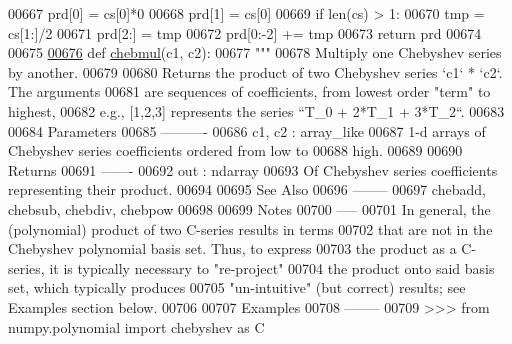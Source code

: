 \begin{DoxyCode}
00667     prd[0] = cs[0]*0
00668     prd[1] = cs[0]
00669     \textcolor{keywordflow}{if} len(cs) > 1:
00670         tmp = cs[1:]/2
00671         prd[2:] = tmp
00672         prd[0:-2] += tmp
00673     \textcolor{keywordflow}{return} prd
00674 
00675 
\hypertarget{chebyshev_8py_source_l00676}{}\hyperlink{namespacepyneb_1_1utils_1_1chebyshev_aca5aab8be2c47559d4489fd1dac11f75}{00676} \textcolor{keyword}{def }\hyperlink{namespacepyneb_1_1utils_1_1chebyshev_aca5aab8be2c47559d4489fd1dac11f75}{chebmul}(c1, c2):
00677     \textcolor{stringliteral}{"""}
00678 \textcolor{stringliteral}{    Multiply one Chebyshev series by another.}
00679 \textcolor{stringliteral}{}
00680 \textcolor{stringliteral}{    Returns the product of two Chebyshev series `c1` * `c2`.  The arguments}
00681 \textcolor{stringliteral}{    are sequences of coefficients, from lowest order "term" to highest,}
00682 \textcolor{stringliteral}{    e.g., [1,2,3] represents the series ``T\_0 + 2*T\_1 + 3*T\_2``.}
00683 \textcolor{stringliteral}{}
00684 \textcolor{stringliteral}{    Parameters}
00685 \textcolor{stringliteral}{    ----------}
00686 \textcolor{stringliteral}{    c1, c2 : array\_like}
00687 \textcolor{stringliteral}{        1-d arrays of Chebyshev series coefficients ordered from low to}
00688 \textcolor{stringliteral}{        high.}
00689 \textcolor{stringliteral}{}
00690 \textcolor{stringliteral}{    Returns}
00691 \textcolor{stringliteral}{    -------}
00692 \textcolor{stringliteral}{    out : ndarray}
00693 \textcolor{stringliteral}{        Of Chebyshev series coefficients representing their product.}
00694 \textcolor{stringliteral}{}
00695 \textcolor{stringliteral}{    See Also}
00696 \textcolor{stringliteral}{    --------}
00697 \textcolor{stringliteral}{    chebadd, chebsub, chebdiv, chebpow}
00698 \textcolor{stringliteral}{}
00699 \textcolor{stringliteral}{    Notes}
00700 \textcolor{stringliteral}{    -----}
00701 \textcolor{stringliteral}{    In general, the (polynomial) product of two C-series results in terms}
00702 \textcolor{stringliteral}{    that are not in the Chebyshev polynomial basis set.  Thus, to express}
00703 \textcolor{stringliteral}{    the product as a C-series, it is typically necessary to "re-project"}
00704 \textcolor{stringliteral}{    the product onto said basis set, which typically produces}
00705 \textcolor{stringliteral}{    "un-intuitive" (but correct) results; see Examples section below.}
00706 \textcolor{stringliteral}{}
00707 \textcolor{stringliteral}{    Examples}
00708 \textcolor{stringliteral}{    --------}
00709 \textcolor{stringliteral}{    >>> from numpy.polynomial import chebyshev as C}

\end{DoxyCode}
